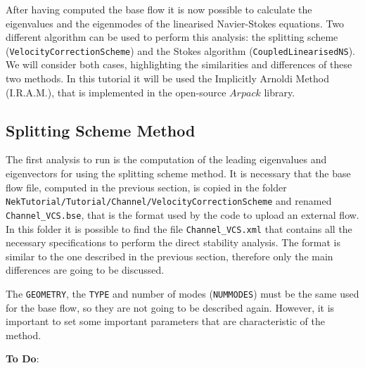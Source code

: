 \documentclass[a4paper,12pt]{article}
\begin{document}
After having computed the base flow it is now possible to calculate the eigenvalues and the eigenmodes of the linearised Navier-Stokes equations. Two different algorithm can be used to perform this analysis: the splitting scheme (\texttt{VelocityCorrectionScheme}) and the Stokes algorithm (\texttt{CoupledLinearisedNS}).  We will consider both cases, highlighting the similarities and differences of these two methods. In this tutorial it will be used the Implicitly Arnoldi Method (I.R.A.M.), that is implemented in the open-source $Arpack$ library.

\subsection{Splitting Scheme Method}

The first analysis to run is the computation of the leading eigenvalues and eigenvectors for using the splitting scheme method. It is necessary that the base flow file, computed  in the previous section, is copied in the folder  \texttt{NekTutorial/Tutorial/Channel/VelocityCorrectionScheme} and renamed \texttt{Channel\_VCS.bse}, that is the format used by the code to upload an external flow.  In this folder it is possible to find the file \texttt{Channel\_VCS.xml} that contains all the necessary specifications to perform the direct stability analysis. The format is similar to the one described in the previous section, therefore only the main differences are going to be discussed.

\smallskip
The \texttt{GEOMETRY}, the \texttt{TYPE} and  number of modes (\texttt{NUMMODES}) must be the same used for the base flow, so they are not going to be described again. However, it is important to set some important parameters that are characteristic of the method. 

\textbf{To Do}: 
\end{document}
